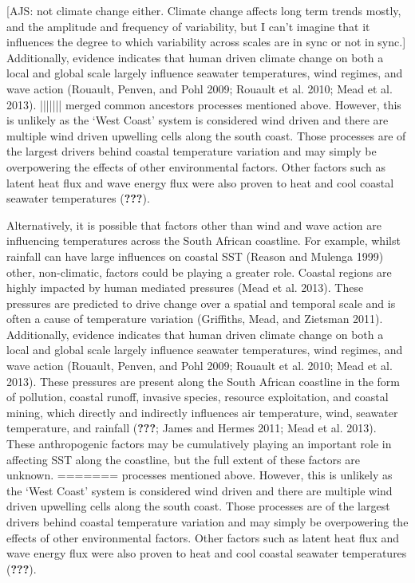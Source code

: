 \documentclass[12pt,A4paper,]{article}
\begin{document}
{[}AJS: not climate change either. Climate change affects long term
trends mostly, and the amplitude and frequency of variability, but I
can't imagine that it influences the degree to which variability across
scales are in sync or not in sync.{]} Additionally, evidence indicates
that human driven climate change on both a local and global scale
largely influence seawater temperatures, wind regimes, and wave action
(Rouault, Penven, and Pohl 2009; Rouault et al. 2010; Mead et al. 2013).
||||||| merged common ancestors
processes mentioned above. However, this is unlikely as the `West Coast'
system is considered wind driven and there are multiple wind driven
upwelling cells along the south coast. Those processes are of the
largest drivers behind coastal temperature variation and may simply be
overpowering the effects of other environmental factors. Other factors
such as latent heat flux and wave energy flux were also proven to heat
and cool coastal seawater temperatures ({\textbf{???}}).

Alternatively, it is possible that factors other than wind and wave
action are influencing temperatures across the South African coastline.
For example, whilst rainfall can have large influences on coastal SST
(Reason and Mulenga 1999) other, non-climatic, factors could be playing
a greater role. Coastal regions are highly impacted by human mediated
pressures (Mead et al. 2013). These pressures are predicted to drive
change over a spatial and temporal scale and is often a cause of
temperature variation (Griffiths, Mead, and Zietsman 2011).
Additionally, evidence indicates that human driven climate change on
both a local and global scale largely influence seawater temperatures,
wind regimes, and wave action (Rouault, Penven, and Pohl 2009; Rouault
et al. 2010; Mead et al. 2013). These pressures are present along the
South African coastline in the form of pollution, coastal runoff,
invasive species, resource exploitation, and coastal mining, which
directly and indirectly influences air temperature, wind, seawater
temperature, and rainfall ({\textbf{???}}; James and Hermes 2011; Mead
et al. 2013). These anthropogenic factors may be cumulatively playing an
important role in affecting SST along the coastline, but the full extent
of these factors are unknown.
=======
processes mentioned above. However, this is unlikely as the `West Coast'
system is considered wind driven and there are multiple wind driven
upwelling cells along the south coast. Those processes are of the
largest drivers behind coastal temperature variation and may simply be
overpowering the effects of other environmental factors. Other factors
such as latent heat flux and wave energy flux were also proven to heat
and cool coastal seawater temperatures ({\textbf{???}}).
\end{document}
